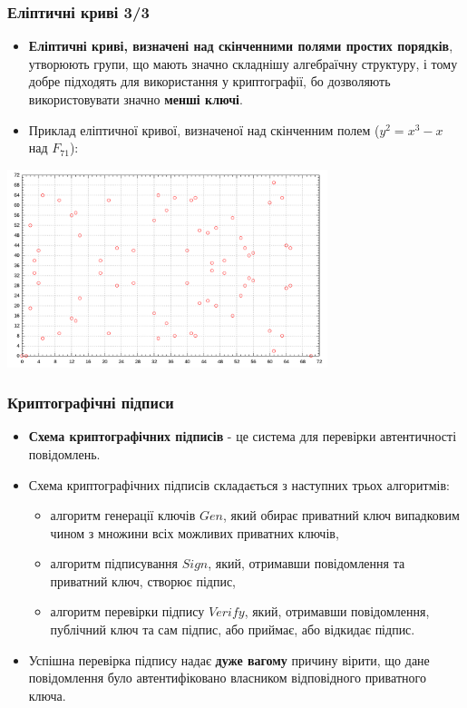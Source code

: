 \documentclass{beamer}
\begin{document}
\begin{frame}
  \frametitle{Еліптичні криві 3/3}
  \begin{itemize}
  \item \textbf{Еліптичні криві, визначені над скінченними полями простих
      порядків}, утворюють групи, що мають значно складнішу алгебраїчну
    структуру, і тому добре підходять для використання у криптографії, бо
    дозволяють використовувати значно \textbf{менші ключі}.
  \item Приклад еліптичної кривої, визначеної над скінченним полем ($y^2 = x
    ^3 - x$ над $F_{71}$):
  \end{itemize}
  \begin{center}
    \includegraphics[width=0.7\textwidth]{ec_finite_field_group}
  \end{center}
\end{frame}

\begin{frame}
  \frametitle{Криптографічні підписи}
  \begin{itemize}
  \item \textbf{Схема криптографічних підписів} - це система для перевірки
    автентичності повідомлень.
  \item Схема криптографічних підписів складається з наступних трьох алгоритмів:
    \begin{itemize}
    \item алгоритм генерації ключів $Gen$, який обирає приватний ключ випадковим
      чином з множини всіх можливих приватних ключів,
    \item алгоритм підписування $Sign$, який, отримавши повідомлення та
      приватний ключ, створює підпис,
    \item алгоритм перевірки підпису $Verify$, який, отримавши повідомлення,
      публічний ключ та сам підпис, або приймає, або відкидає підпис.
    \end{itemize}
  \item Успішна перевірка підпису надає \textbf{дуже вагому} причину вірити, що
    дане повідомлення було автентифіковано власником відповідного приватного
    ключа.
  \end{itemize}
\end{frame}
\end{document}
